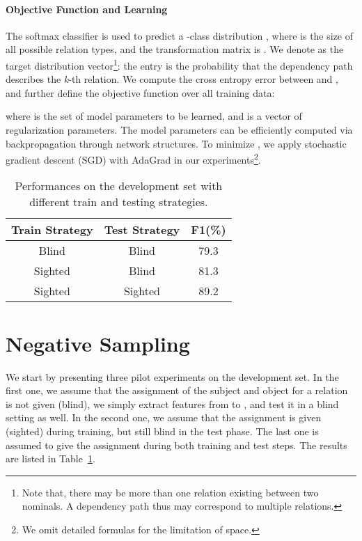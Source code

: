 \documentclass[11pt,a4paper]{article}
\begin{document}
\paragraph{Objective Function and Learning}
The softmax classifier is used to predict a -class distribution , where   is the size of all possible relation types, and 
the transformation matrix is . 
We denote  as the target distribution vector\footnote{Note that, there may be more than one relation existing between two nominals. A dependency path thus may correspond to multiple relations.}:
the entry  is the probability that the dependency path describes the \textit{k}-th relation. 
We compute the cross entropy error between  and , and further define the objective function over all training data:

where  is the set of model parameters to be learned, and 
 is a vector of regularization parameters. The model parameters  can be efficiently computed via 
backpropagation through network structures. To minimize , we apply stochastic gradient descent (SGD) with AdaGrad \cite{DBLP:journals/jmlr/DuchiHS11} in our experiments\footnote{We omit detailed formulas for the limitation of space.}.

\begin{table}
\small
\centering
\begin{tabular}{c|c|c}
\hline
Train Strategy & Test Strategy & F1(\%) \\
\hline
Blind & Blind & 79.3\\
\hline
Sighted & Blind & 81.3\\
\hline
Sighted & Sighted & 89.2\\
\hline
\end{tabular}
\caption{Performances on the development set with different train and testing strategies.}
\label{tab:ns_results}
\end{table}
\section{Negative Sampling}
\label{sec:ns}
We start by presenting three pilot experiments on the development set. In the first one, we assume that the assignment of the subject and object for a relation is not given (blind), we simply extract features from  to , and test it in a blind setting as well. In the second one, we assume that the assignment is given (sighted) during training, but still blind in the test phase. The last one is assumed to give the assignment during both  training and test steps. The results are listed in Table~\ref{tab:ns_results}.
\end{document}
